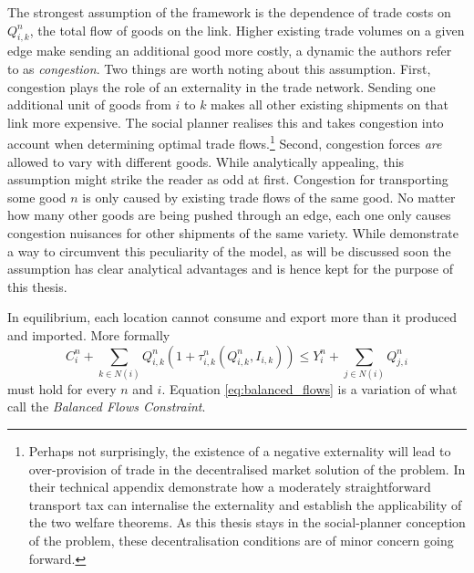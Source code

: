 \documentclass[11pt, oneside]{article}   	%
\begin{document}
The strongest assumption of the \citeauthor{fajgelbaum_optimal_2017} framework is the dependence of trade costs on $Q_{i,k}^{n}$, the total flow of goods on the link. Higher existing trade volumes on a given edge make sending an additional good more costly, a dynamic the authors refer to as \emph{congestion}. Two things are worth noting about this assumption. First, congestion plays the role of an externality in the trade network. Sending one additional unit of goods from $i$ to $k$ makes all other existing shipments on that link more expensive. The social planner realises this and takes congestion into account when determining optimal trade flows.\footnote{Perhaps not surprisingly, the existence of a negative externality will lead to over-provision of trade in the decentralised market solution of the problem. In their technical appendix \citeauthor{fajgelbaum_optimal_2017} demonstrate how a moderately straightforward transport tax can internalise the externality and establish the applicability of the two welfare theorems. As this thesis stays in the social-planner conception of the problem, these decentralisation conditions are of minor concern going forward.} Second, congestion forces \emph{are} allowed to vary with different goods. While analytically appealing, this assumption might strike the reader as odd at first. Congestion for transporting some good $n$ is only caused by existing trade flows of the same good. No matter how many other goods are being pushed through an edge, each one only causes congestion nuisances for other shipments of the same variety. While \citeauthor{fajgelbaum_optimal_2017} demonstrate a way to circumvent this peculiarity of the model, as will be discussed soon the assumption has clear analytical advantages and is hence kept for the purpose of this thesis.

In equilibrium, each location cannot consume and export more than it produced and imported. More formally
\begin{equation}
  C_{i}^{n} + \sum_{k\in N(i)}^{}Q_{i,k}^{n}(1+\tau_{i,k}^{n}(Q_{i,k}^{n}, I_{i,k})) \leq Y_{i}^{n} + \sum_{j\in N(i)}^{}Q_{j,i}^{n}
  \label{eq:balanced_flows}
\end{equation}
must hold for every $n$ and $i$. Equation \eqref{eq:balanced_flows} is a variation of what \citeauthor{fajgelbaum_optimal_2017} call the \emph{Balanced Flows Constraint}.
\end{document}
